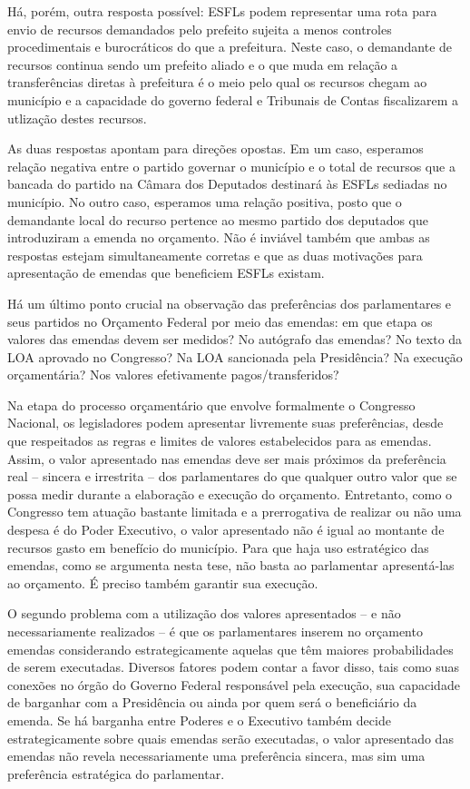 Há, porém, outra resposta possível: ESFLs podem representar uma rota para envio de recursos demandados pelo prefeito sujeita a menos controles procedimentais e burocráticos do que a prefeitura. Neste caso, o demandante de recursos continua sendo um prefeito aliado e o que muda em relação a transferências diretas à prefeitura é o meio pelo qual os recursos chegam ao município e a capacidade do governo federal e Tribunais de Contas fiscalizarem a utlização destes recursos.

As duas respostas apontam para direções opostas. Em um caso, esperamos relação negativa entre o partido governar o município e o total de recursos que a bancada do partido na Câmara dos Deputados destinará às ESFLs sediadas no município. No outro caso, esperamos uma relação positiva, posto que o demandante local do recurso pertence ao mesmo partido dos deputados que introduziram a emenda no orçamento. Não é inviável também que ambas as respostas estejam simultaneamente corretas e que as duas motivações para apresentação de emendas que beneficiem ESFLs existam.

Há um último ponto crucial na observação das preferências dos parlamentares e seus partidos no Orçamento Federal por meio das emendas: em que etapa os valores das emendas devem ser medidos? No autógrafo das emendas? No texto da LOA aprovado no Congresso? Na LOA sancionada pela Presidência? Na execução orçamentária? Nos valores efetivamente pagos/transferidos?

Na etapa do processo orçamentário que envolve formalmente o Congresso Nacional, os legisladores podem apresentar livremente suas preferências, desde que respeitados as regras e limites de valores estabelecidos para as emendas. Assim, o valor apresentado nas emendas deve ser mais próximos da preferência real -- sincera e irrestrita -- dos parlamentares do que qualquer outro valor que se possa medir durante a elaboração e execução do orçamento. Entretanto, como o Congresso tem atuação bastante limitada e a prerrogativa de realizar ou não uma despesa é do Poder Executivo, o valor apresentado não é igual ao montante de recursos gasto em benefício do município. Para que haja uso estratégico das emendas, como se argumenta nesta tese, não basta ao parlamentar apresentá-las ao orçamento. É preciso também garantir sua execução.

O segundo problema com a utilização dos valores apresentados -- e não necessariamente realizados -- é que os parlamentares inserem no orçamento emendas considerando estrategicamente aquelas que têm maiores probabilidades de serem executadas. Diversos fatores podem contar a favor disso, tais como suas conexões no órgão do Governo Federal responsável pela execução, sua capacidade de barganhar com a Presidência ou ainda por quem será o beneficiário da emenda. Se há barganha entre Poderes e o Executivo também decide estrategicamente sobre quais emendas serão executadas, o valor apresentado das emendas não revela necessariamente uma preferência sincera, mas sim uma preferência estratégica do parlamentar.


